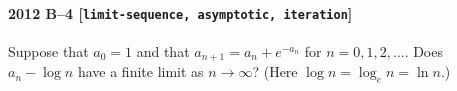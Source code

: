 \paragraph{2012 B--4 \textnormal{[\texttt{limit-sequence, asymptotic, iteration}]}}
Suppose that $a_0 = 1$ and that $a_{n+1} = a_n + e^{-a_n}$ for $n=0,1,2,\dots$. Does $a_n - \log n$
have a finite limit as $n \to \infty$? (Here $\log n = \log_e n = \ln n$.)
